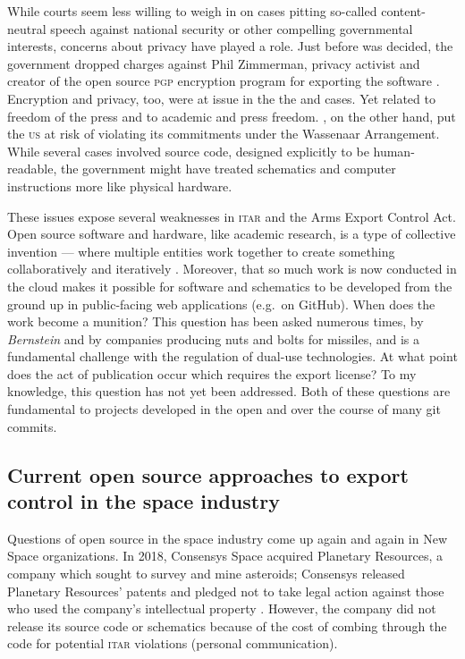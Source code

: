 \documentclass[preprint,twocolumn,5p]{elsarticle}
\begin{document}
While courts seem less willing to weigh in on cases pitting so-called content-neutral speech against national security or other compelling governmental interests, concerns about privacy have played a role. Just before  was decided, the government dropped charges against Phil Zimmerman, privacy activist and creator of the open source \textsc{pgp} encryption program for exporting the software \citep{Markoff1996}. Encryption and privacy, too, were at issue in the the  and  cases. Yet  related to freedom of the press and  to academic and press freedom. , on the other hand, put the \textsc{us} at risk of violating its commitments under the Wassenaar Arrangement. While several cases involved source code, designed explicitly to be human-readable, the government might have treated schematics and computer instructions more like physical hardware.

These issues expose several weaknesses in \textsc{itar} and the Arms Export Control Act. Open source software and hardware, like academic research, is a type of collective invention --- where multiple entities work together to create something collaboratively and iteratively \citep{Allen1983,Schrape2019}. Moreover, that so much work is now conducted in the cloud makes it possible for software and schematics to be developed from the ground up in public-facing web applications (e.g.\ on GitHub). When does the work become a munition? This question has been asked numerous times, by \textit{Bernstein} and by companies producing nuts and bolts for missiles, and is a fundamental challenge with the regulation of dual-use technologies. At what point does the act of publication occur which requires the export license? To my knowledge, this question has not yet been addressed. Both of these questions are fundamental to projects developed in the open and over the course of many git commits.

\subsection{Current open source approaches to export control in the space industry}
Questions of open source in the space industry come up again and again in New Space organizations. In 2018, Consensys Space acquired Planetary Resources, a company which sought to survey and mine asteroids; Consensys released Planetary Resources' patents and pledged not to take legal action against those who used the company's intellectual property \citep{Consensys2018}. However, the company did not release its source code or schematics because of the cost of combing through the code for potential \textsc{itar} violations (personal communication).
\end{document}
